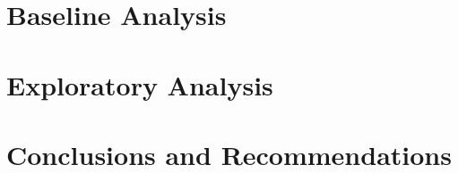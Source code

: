 \documentclass[12pt]{amsart}
\begin{document}
\section{Baseline Analysis}


\section{Exploratory Analysis}


\section{Conclusions and Recommendations}

\end{document}
